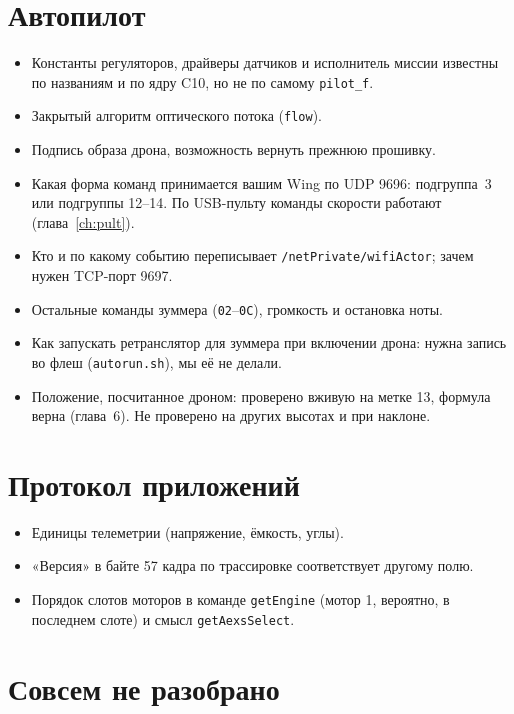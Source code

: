 \section{Автопилот}

\begin{itemize}
  \item Константы регуляторов, драйверы датчиков и исполнитель миссии известны по названиям и по ядру C10, но не по самому \texttt{pilot\_f}. \nei{}
  \item Закрытый алгоритм оптического потока (\texttt{flow}). \nei{}
  \item Подпись образа дрона, возможность вернуть прежнюю прошивку. \nei{}
  \item Какая форма команд принимается вашим Wing по UDP 9696: подгруппа~3 или подгруппы 12--14. По USB-пульту команды скорости работают (глава~\ref{ch:pult}). \nei{}
  \item Кто и по какому событию переписывает \texttt{/netPrivate/wifiActor}; зачем нужен TCP-порт 9697. \nei{}
  \item Остальные команды зуммера (\texttt{02}--\texttt{0C}), громкость и остановка ноты. \nei{}
  \item Как запускать ретранслятор для зуммера при включении дрона: нужна запись во флеш (\texttt{autorun.sh}), мы её не делали. \nei{}
  \item Положение, посчитанное дроном: проверено вживую на метке 13, формула верна (глава~6). Не проверено на других высотах и при наклоне. \pr{}
\end{itemize}

\section{Протокол приложений}

\begin{itemize}
  \item Единицы телеметрии (напряжение, ёмкость, углы). \nei{}
  \item «Версия» в байте 57 кадра по трассировке соответствует другому полю. \nei{}
  \item Порядок слотов моторов в команде \texttt{getEngine} (мотор 1, вероятно, в последнем слоте) и смысл \texttt{getAexsSelect}. \nei{}
\end{itemize}

\section{Совсем не разобрано}

